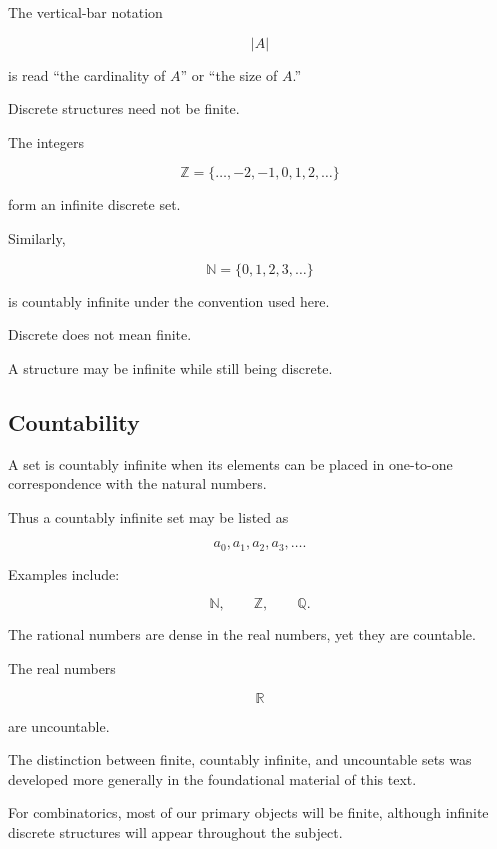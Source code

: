 The vertical-bar notation

\[
|A|
\]

is read ``the cardinality of \(A\)'' or ``the size of \(A\).''

Discrete structures need not be finite.

The integers

\[
\mathbb{Z}
=
\{\ldots,-2,-1,0,1,2,\ldots\}
\]

form an infinite discrete set.

Similarly,

\[
\mathbb{N}
=
\{0,1,2,3,\ldots\}
\]

is countably infinite under the convention used here.

\begin{importantbox}
Discrete does not mean finite.

A structure may be infinite while still being discrete.
\end{importantbox}

\subsection{Countability}
\label{subsec:discrete-countability}

A set is countably infinite when its elements can be placed in
one-to-one correspondence with the natural numbers.

Thus a countably infinite set may be listed as

\[
a_0,a_1,a_2,a_3,\ldots.
\]

Examples include:

\[
\mathbb{N},
\qquad
\mathbb{Z},
\qquad
\mathbb{Q}.
\]

The rational numbers are dense in the real numbers, yet they are
countable.

The real numbers

\[
\mathbb{R}
\]

are uncountable.

The distinction between finite, countably infinite, and uncountable
sets was developed more generally in the foundational material of this
text.

For combinatorics, most of our primary objects will be finite, although
infinite discrete structures will appear throughout the subject.

